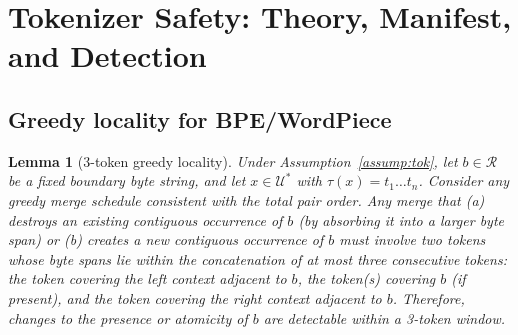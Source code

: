\documentclass{article}
\newtheorem{lemma}{Lemma}
\begin{document}
\section{Tokenizer Safety: Theory, Manifest, and Detection}\label{sec:tokenizers}
\subsection{Greedy locality for BPE/WordPiece}
\begin{lemma}[3-token greedy locality]\label{lem:local}
Under Assumption~\ref{assump:tok}, let $b\in\mathcal{R}$ be a fixed boundary byte string, and let $x\in\mathcal{U}^\ast$ with $\tau(x)=t_1\dots t_n$. Consider any greedy merge schedule consistent with the total pair order. Any merge that (a) destroys an existing contiguous occurrence of $b$ (by absorbing it into a larger byte span) or (b) creates a new contiguous occurrence of $b$ must involve two tokens whose byte spans lie within the concatenation of at most three consecutive tokens: the token covering the left context adjacent to $b$, the token(s) covering $b$ (if present), and the token covering the right context adjacent to $b$. Therefore, changes to the presence or atomicity of $b$ are detectable within a 3-token window.
\end{lemma}
\end{document}
